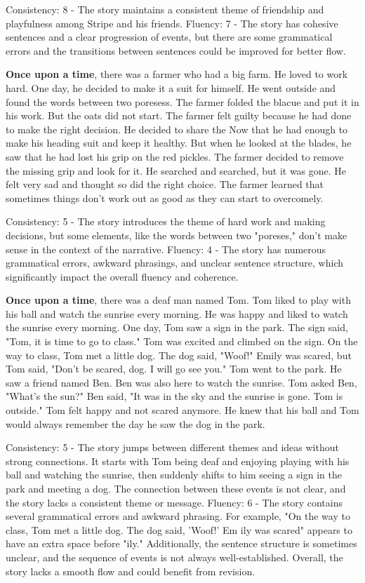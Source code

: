 \documentclass{article}
\begin{document}
Consistency: 8 - The story maintains a consistent theme of friendship and playfulness among Stripe and his friends.
Fluency: 7 - The story has cohesive sentences and a clear progression of events, but there are some grammatical errors and the transitions between sentences could be improved for better flow.

\textbf{Once upon a time}, there was a farmer who had a big farm. He loved to work hard. One day, he decided to make it a suit for himself. He went outside and found the words between two poresess. The farmer folded the blacue and put it in his work. But the oats did not start. The farmer felt guilty because he had done to make the right decision. He decided to share the Now that he had enough to make his heading suit and keep it healthy. But when he looked at the blades, he saw that he had lost his grip on the red pickles. The farmer decided to remove the missing grip and look for it. He searched and searched, but it was gone. He felt very sad and thought so did the right choice. The farmer learned that sometimes things don't work out as good as they can start to overcomely.

Consistency: 5 - The story introduces the theme of hard work and making decisions, but some elements, like the words between two "poreses," don't make sense in the context of the narrative.
Fluency: 4 - The story has numerous grammatical errors, awkward phrasings, and unclear sentence structure, which significantly impact the overall fluency and coherence.

\textbf{Once upon a time}, there was a deaf man named Tom. Tom liked to play with his ball and watch the sunrise every morning. He was happy and liked to watch the sunrise every morning. One day, Tom saw a sign in the park. The sign said, "Tom, it is time to go to class." Tom was excited and climbed on the sign. On the way to class, Tom met a little dog. The dog said, "Woof!" Emily was scared, but Tom said, "Don't be scared, dog. I will go see you." Tom went to the park. He saw a friend named Ben. Ben was also here to watch the sunrise. Tom asked Ben, "What's the sun?" Ben said, "It was in the sky and the sunrise is gone. Tom is outside." Tom felt happy and not scared anymore. He knew that his ball and Tom would always remember the day he saw the dog in the park.

Consistency: 5 - The story jumps between different themes and ideas without strong connections. It starts with Tom being deaf and enjoying playing with his ball and watching the sunrise, then suddenly shifts to him seeing a sign in the park and meeting a dog. The connection between these events is not clear, and the story lacks a consistent theme or message.
Fluency: 6 - The story contains several grammatical errors and awkward phrasing. For example, "On the way to class, Tom met a little dog. The dog said, 'Woof!' Em ily was scared" appears to have an extra space before "ily." Additionally, the sentence structure is sometimes unclear, and the sequence of events is not always well-established. Overall, the story lacks a smooth flow and could benefit from revision.
\end{document}
